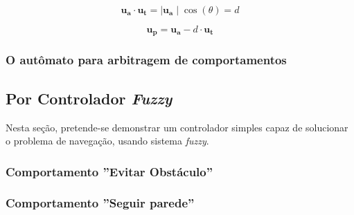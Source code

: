 		\begin{equation}
			\label{eq:vetorPerpendicularSP2}
			\mathbf{u_a} \cdot \mathbf{u_t} = \mid \mathbf{u_a} \mid \cos(\theta) = d
		\end{equation}
		
		\begin{equation}
			\label{eq:vetorPerpendicularSP3}
			\mathbf{u_p} = \mathbf{u_a} - d \cdot \mathbf{u_t}
		\end{equation}
		
		\subsubsection{O autômato para arbitragem de comportamentos}
	
		
	
		
		
		
	
	\subsection{Por Controlador \textit{Fuzzy}}
	
	Nesta seção, pretende-se demonstrar um controlador simples capaz de solucionar 
	o problema de navegação, usando sistema \textit{fuzzy}.
	
	\subsubsection{Comportamento ''Evitar Obstáculo''}
	
	
	
	
	
	
	
	
	
	
	
	\subsubsection{Comportamento ''Seguir parede''}

	
	
	

	
	
